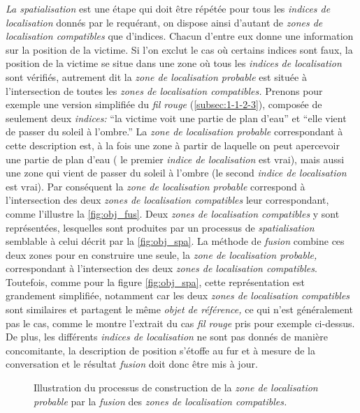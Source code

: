 \emph{La spatialisation} est une étape qui doit être répétée pour tous
les \emph{indices de localisation} donnés par le requérant, on dispose
ainsi d'autant de \emph{zones de localisation compatibles} que
d'indices. Chacun d'entre eux donne une information sur la position de
la victime. Si l'on exclut le cas où certains indices sont faux, la
position de la victime se situe dans une zone où tous les
\emph{indices de localisation} sont vérifiés, autrement dit la
\emph{zone de localisation probable} est située à l'intersection de
toutes les \emph{zones de localisation compatibles.}
%
Prenons pour exemple une version simplifiée du \emph{fil rouge}
(\ref{subsec:1-1-2-3}), composée de seulement deux \emph{indices:}
\enquote{la victime voit une partie de plan d'eau} et \enquote{elle
  vient de passer du soleil à l'ombre.}  La \emph{zone de localisation
  probable} correspondant à cette description est, à la fois une zone
à partir de laquelle on peut apercevoir une partie de plan d'eau (\ie
le premier \emph{indice de localisation} est vrai), mais aussi une
zone qui vient de passer du soleil à l'ombre (\ie le second
\emph{indice de localisation} est vrai). Par conséquent la \emph{zone
  de localisation probable} correspond à l'intersection des deux
\emph{zones de localisation compatibles} leur correspondant, comme
l'illustre la \autoref{fig:obj_fus}. Deux \emph{zones de localisation
  compatibles} y sont représentées, lesquelles sont produites par un
processus de \emph{spatialisation} semblable à celui décrit par la
\autoref{fig:obj_spa}. La méthode de \emph{fusion} combine ces deux
zones pour en construire une seule, la \emph{zone de localisation
  probable,} correspondant à l'intersection des deux \emph{zones de
  localisation compatibles}. Toutefois, comme pour la figure
\ref{fig:obj_spa}, cette représentation est grandement simplifiée,
notamment car les deux \emph{zones de localisation compatibles} sont
similaires et partagent le même \emph{objet de référence,} ce qui
n'est généralement pas le cas, comme le montre l'extrait du cas
\emph{fil rouge} pris pour exemple ci-dessus. De plus, les différents
\emph{indices de localisation} ne sont pas donnés de manière
concomitante, la description de position s'étoffe au fur et à mesure
de la conversation et le résultat \emph{fusion} doit donc être mis à
jour.

\begin{figure}
  \centering
  
  \caption{Illustration du processus de construction de la \emph{zone
      de localisation probable} par la \emph{fusion} des \emph{zones
      de localisation compatibles.}}
  \label{fig:obj_fus}
\end{figure}

